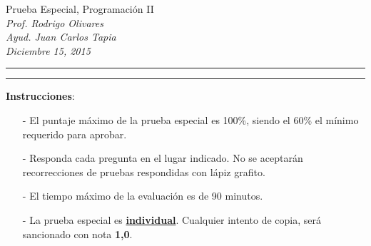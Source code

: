 \documentclass[10pt]{article}
\begin{document}
\begin{center}
    {\Large Prueba Especial, Programaci\'on II} \\
    \emph{\small Prof. Rodrigo Olivares} \\
	\emph{\small Ayud. Juan Carlos Tapia} \\
    \emph{\scriptsize Diciembre 15, 2015}
\end{center}
\vspace*{-35pt}
\begin{center}
    \rule{1\textwidth}{.3pt}
\end{center}
\vspace*{-42pt}
\begin{center}
    \rule{1\textwidth}{2pt}
\end{center}

\vspace*{-15pt}
\textbf{Instrucciones}:
\vspace*{-15pt}

\begin{itemize}
    \item[-] El puntaje m\'aximo de la prueba especial es 100\%, siendo el 60\% el m\'inimo requerido para aprobar.
	\item[-] Responda cada pregunta en el lugar indicado. No se aceptar\'an recorrecciones de pruebas respondidas con l\'apiz grafito.
	\item[-] El tiempo m\'aximo de la evaluaci\'on es de 90 minutos.
    \item[-] La prueba especial es \underline{\textbf{individual}}. Cualquier intento de copia, ser\'a sancionado con nota \textbf{1,0}.
\end{itemize}
\vspace*{-20pt}
\end{document}

